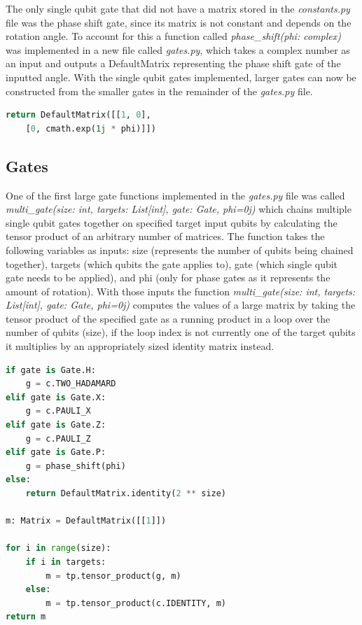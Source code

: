 \documentclass{article}
\begin{document}
The only single qubit gate that did not have a matrix stored in the \textit{constants.py} file was the phase shift gate, since its matrix is not constant and depends on the rotation angle. To account for this a function called \textit{phase\_shift(phi: complex)} was implemented in a new file called \textit{gates.py}, which takes a complex number as an input and outputs a DefaultMatrix representing the phase shift gate of the inputted angle. With the single qubit gates implemented, larger gates can now be constructed from the smaller gates in the remainder of the \textit{gates.py} file.

\begin{file}
\begin{lstlisting}[language=Python]
return DefaultMatrix([[1, 0], 
	[0, cmath.exp(1j * phi)]])
\end{lstlisting}
\end{file}


\subsection{Gates}

One of the first large gate functions implemented in the \textit{gates.py} file was called \textit{multi\_gate(size: int, targets: List[int], gate: Gate, phi=0j)} which chains multiple single qubit gates together on specified target input qubits by calculating the tensor product of an arbitrary number of matrices. The function takes the following variables as inputs: size (represents the number of qubits being chained together), targets (which qubits the gate applies to), gate (which single qubit gate needs to be applied), and phi (only for phase gates as it represents the amount of rotation). With those inputs the function \textit{multi\_gate(size: int, targets: List[int], gate: Gate, phi=0j)} computes the values of a large matrix by taking the tensor product of the specified gate as a running product in a loop over the number of qubits (size), if the loop index is not currently one of the target qubits it multiplies by an appropriately sized identity matrix instead.

\begin{file}
\begin{lstlisting}[language=Python]
if gate is Gate.H:
    g = c.TWO_HADAMARD
elif gate is Gate.X:
    g = c.PAULI_X
elif gate is Gate.Z:
    g = c.PAULI_Z
elif gate is Gate.P:
    g = phase_shift(phi)
else:
    return DefaultMatrix.identity(2 ** size)

m: Matrix = DefaultMatrix([[1]])

for i in range(size):
    if i in targets:
        m = tp.tensor_product(g, m)
    else:
        m = tp.tensor_product(c.IDENTITY, m)
return m

\end{lstlisting}
\end{file}
\end{document}
